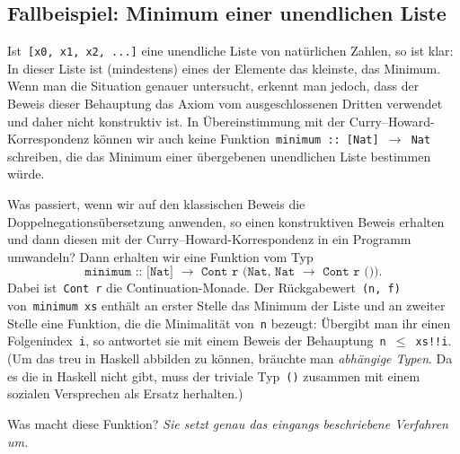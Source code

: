 \documentclass[a4paper,ngerman,10pt]{scrartcl}
\theoremstyle{plain}
\begin{document}
\subsection*{Fallbeispiel: Minimum einer unendlichen Liste}

Ist~\texttt{[x0, x1, x2, ...]} eine unendliche Liste von natürlichen Zahlen, so
ist klar: In dieser Liste ist (mindestens) eines der Elemente das kleinste, das Minimum. Wenn man
die Situation genauer untersucht, erkennt man jedoch, dass der Beweis dieser
Behauptung das Axiom vom ausgeschlossenen Dritten verwendet und daher nicht
konstruktiv ist. In Übereinstimmung mit der Curry--Howard-Korrespondenz können
wir auch keine Funktion~\texttt{minimum :: [Nat] $\to$ Nat} schreiben, die das
Minimum einer übergebenen unendlichen Liste bestimmen würde.

Was passiert, wenn wir auf den klassischen Beweis die
Doppelnegationsübersetzung anwenden, so einen konstruktiven Beweis erhalten und
dann diesen mit der Curry--Howard-Korrespondenz in ein Programm umwandeln? Dann
erhalten wir eine Funktion vom Typ \[\texttt{minimum :: [Nat] $\to$ Cont r (Nat,
Nat $\to$ Cont r ())}.\] Dabei ist~\texttt{Cont r} die Con\-ti\-nuation-Monade. Der
Rückgabewert~\texttt{(n, f)} von~\texttt{minimum xs} enthält an erster Stelle
das Minimum der Liste und an zweiter Stelle eine Funktion, die die Minimalität
von~\texttt{n} bezeugt: Übergibt man ihr einen Folgenindex~\texttt{i}, so
antwortet sie mit einem Beweis der Behauptung~\texttt{n $\leq$ xs!!i}. (Um das
treu in Haskell abbilden zu können, bräuchte man \emph{abhängige Typen}. Da es
die in Haskell nicht gibt, muss der triviale Typ~\texttt{()} zusammen mit einem
sozialen Versprechen als Ersatz herhalten.)

Was macht diese Funktion? \emph{Sie setzt genau das eingangs beschriebene
Verfahren um.}

\renewcommand{\thefootnotemark}{}
\end{document}
